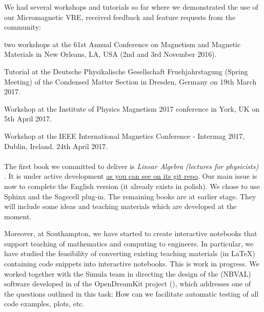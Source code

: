 \documentclass{deliverablereport}
\begin{document}
We had several workshops and tutorials so far where we demonstrated the use of our Micromagnetic VRE, received feedback and feature requests from the community:

\begin{compactitem}
\item two workshops at the 61st Annual Conference on Magnetism and Magnetic Materials in New Orleans,
    LA, USA (2nd and 3rd November 2016).
\item Tutorial at the Deutsche Physikalische Gesellschaft Fruehjahrstagung (Spring Meeting) of the Condensed Matter Section in Dresden, Germany on 19th March 2017.
\item Workshop at the Institute of Physics Magnetism 2017 conference in York, UK on 5th April 2017.
\item Workshop at the IEEE International Magnetics Conference - Intermag 2017, Dublin, Ireland. 24th April 2017.
\end{compactitem}

\paragraph{}


The first book we committed to deliver is \emph{Linear Algebra (lectures for physicists)} . It is under active development \href{https://github.com/Hadriamit/iODKbook2}{as you can see on its git repo}. Our main issue is now to complete the English version (it already exists in polish). We chose to use Sphinx and the Sagecell plug-in. The remaining books are at earlier stage. They will include some ideas and teaching materials which are developed at the moment.

Moreover, at Southampton, we have started to create interactive notebooks that support teaching of mathematics and computing to engineers. In particular, we have studied the feasibility of converting existing teaching materials (in LaTeX) containing code snippets into interactive notebooks. This is work in progress. We worked together with the Simula team in directing the design of the (NBVAL) software developed in  of the OpenDreamKit project (), which addresses one of the questions outlined in this task: How can we facilitate automatic testing of all code examples, plots, etc.

\paragraph{}
\end{document}
